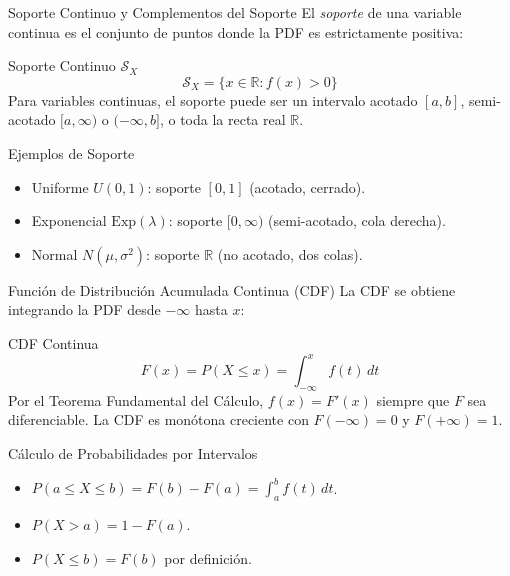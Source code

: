 \documentclass[10pt, aspectratio=169]{beamer}
\begin{document}
\begin{frame}{Soporte Continuo y Complementos del Soporte}
  \footnotesize
  El \emph{soporte} de una variable continua es el conjunto de puntos donde la PDF es estrictamente positiva: \pause

  \vspace{0.1cm}
  \begin{block}{Soporte Continuo $\mathcal{S}_X$}
    $$\mathcal{S}_X = \{x \in \mathbb{R} : f(x) > 0\}$$
    Para variables continuas, el soporte puede ser un intervalo acotado $[a, b]$, semi-acotado $[a, \infty)$ o $(-\infty, b]$, o toda la recta real $\mathbb{R}$.
  \end{block}

  \vspace{0.1cm}
  \pause
  \begin{alertblock}{Ejemplos de Soporte}
    \begin{itemize}\itemsep=0.05cm
      \item Uniforme $U(0, 1)$: soporte $[0, 1]$ (acotado, cerrado).
      \item Exponencial $\text{Exp}(\lambda)$: soporte $[0, \infty)$ (semi-acotado, cola derecha).
      \item Normal $N(\mu, \sigma^{2})$: soporte $\mathbb{R}$ (no acotado, dos colas).
    \end{itemize}
  \end{alertblock}
\end{frame}

\begin{frame}{Función de Distribución Acumulada Continua (CDF)}
  \footnotesize
  La CDF se obtiene integrando la PDF desde $-\infty$ hasta $x$: \pause

  \vspace{0.1cm}
  \begin{block}{CDF Continua}
    $$F(x) = P(X \le x) = \int_{-\infty}^{x} f(t)\,dt$$
    Por el Teorema Fundamental del Cálculo, $f(x) = F'(x)$ siempre que $F$ sea diferenciable. La CDF es monótona creciente con $F(-\infty) = 0$ y $F(+\infty) = 1$.
  \end{block}

  \vspace{0.1cm}
  \pause
  \begin{alertblock}{Cálculo de Probabilidades por Intervalos}
    \begin{itemize}\itemsep=0.05cm
      \item $P(a \le X \le b) = F(b) - F(a) = \int_{a}^{b} f(t)\,dt$.
      \item $P(X > a) = 1 - F(a)$.
      \item $P(X \le b) = F(b)$ por definición.
    \end{itemize}
  \end{alertblock}
\end{frame}
\end{document}
